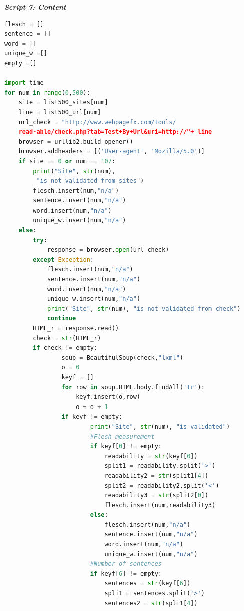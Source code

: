 \documentclass{book}
\begin{document}
\begin{center}
\textit{\textbf{Script 7: Content}}\label{p7}
\end{center}
\begin{lstlisting}[language=Python]
flesch = []
sentence = []
word = []
unique_w =[]
empty =[]

import time 
for num in range(0,500):
    site = list500_sites[num]
    line = list500_url[num] 
    url_check = "http://www.webpagefx.com/tools/
    read-able/check.php?tab=Test+By+Url&uri=http://"+ line
    browser = urllib2.build_opener()
    browser.addheaders = [('User-agent', 'Mozilla/5.0')]
    if site == 0 or num == 107:
        print("Site", str(num),
         "is not validated from sites")
        flesch.insert(num,"n/a")
        sentence.insert(num,"n/a")
        word.insert(num,"n/a")
        unique_w.insert(num,"n/a")  
    else:
        try:
            response = browser.open(url_check)
        except Exception: 
            flesch.insert(num,"n/a")
            sentence.insert(num,"n/a")
            word.insert(num,"n/a")
            unique_w.insert(num,"n/a")
            print("Site", str(num), "is not validated from check")
            continue        
        HTML_r = response.read()
        check = str(HTML_r)       
        if check != empty:                
                soup = BeautifulSoup(check,"lxml")
                o = 0
                keyf = []
                for row in soup.HTML.body.findAll('tr'):
                    keyf.insert(o,row)
                    o = o + 1
                if keyf != empty:                        
                        print("Site", str(num), "is validated")
                        #Flesh measurement
                        if keyf[0] != empty:
                            readability = str(keyf[0])
                            split1 = readability.split('>')
                            readability2 = str(split1[4])
                            split2 = readability2.split('<')
                            readability3 = str(split2[0])
                            flesch.insert(num,readability3)
                        else:
                            flesch.insert(num,"n/a")
                            sentence.insert(num,"n/a")
                            word.insert(num,"n/a")
                            unique_w.insert(num,"n/a")   
                        #Number of sentences   
                        if keyf[6] != empty:
                            sentences = str(keyf[6])
                            spli1 = sentences.split('>')
                            sentences2 = str(spli1[4])

\end{lstlisting}
\end{document}
